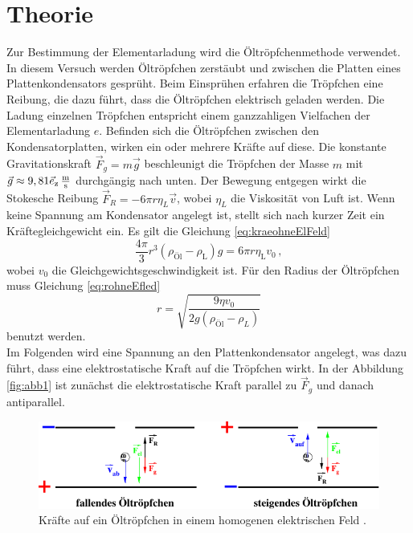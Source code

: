 \section{Theorie}
\label{sec:Theorie}

Zur Bestimmung der Elementarladung wird die Öltröpfchenmethode verwendet. 
In diesem Versuch werden Öltröpfchen zerstäubt und zwischen die Platten eines Plattenkondensators gesprüht.
Beim Einsprühen erfahren die Tröpfchen eine Reibung, die dazu führt, dass die Öltröpfchen elektrisch geladen werden.
Die Ladung einzelnen Tröpfchen entspricht einem ganzzahligen Vielfachen der Elementarladung $e$.
Befinden sich die Öltröpfchen zwischen den Kondensatorplatten, wirken ein oder mehrere Kräfte auf diese. 
Die konstante Gravitationskraft $\vec{F}_g = m \vec{g}$ beschleunigt die Tröpfchen der Masse $m$ mit $\vec{g} \approx 9,81 \vec{e}_\text{z} \,\si{\frac{\meter}{\second}}$ durchgängig nach unten.
Der Bewegung entgegen wirkt die Stokesche Reibung $\vec{F}_R = -6 \pi r \eta_L \vec{v}$, wobei $\eta_L$ die Viskosität von Luft ist.
Wenn keine Spannung am Kondensator angelegt ist, stellt sich nach kurzer Zeit ein Kräftegleichgewicht ein.
Es gilt die Gleichung \eqref{eq:kraeohneElFeld}
\begin{equation}
    \frac{4 \pi}{3} r^3(\rho_\text{Öl} - \rho_\text{L})g = 6 \pi r \eta_\text{L} v_0 \, ,
    \label{eq:kraeohneElFeld}
\end{equation}
wobei $v_0$ die Gleichgewichtsgeschwindigkeit ist. 
Für den Radius der Öltröpfchen muss Gleichung \eqref{eq:rohneEfled}
\begin{equation}
    r = \sqrt{\frac{9 \eta v_0}{2 g (\rho_\text{Öl} - \rho_L)}}
    \label{eq:rohneEfled}
\end{equation}
benutzt werden.\\

Im Folgenden wird eine Spannung an den Plattenkondensator angelegt, was dazu führt, dass eine elektrostatische Kraft auf die Tröpfchen wirkt.
In der Abbildung \autoref{fig:abb1} ist zunächst die elektrostatische Kraft parallel zu $\vec{F}_g$ und danach antiparallel.


\begin{figure}[H]
    \centering
    \includegraphics{figures/Abb1.pdf}
    \caption{Kräfte auf ein Öltröpfchen in einem homogenen elektrischen Feld \cite{ap12}.}
    \label{fig:abb1}
\end{figure}


